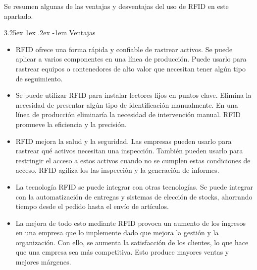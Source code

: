 \documentclass[12pt,a4paper,onecolumn,oneside]{report}
\makeatletter
\newcounter{subsubsubsection}[subsubsection]
\renewcommand\paragraph{\@startsection{paragraph}{5}{\z@}%
  {3.25ex \@plus1ex \@minus.2ex}%
  {-1em}%
  {\normalfont\normalsize\bfseries}}
\makeatother
\begin{document}
\label{Ventajas y desventajas}

Se resumen algunas de las ventajas y desventajas del uso de RFID en este apartado.

\paragraph{Ventajas}
\begin{itemize}
\item RFID ofrece una forma rápida y confiable de rastrear activos. Se puede aplicar a varios componentes en una línea de producción. Puede usarlo para rastrear equipos o contenedores de alto valor que necesitan tener algún tipo de seguimiento.
\item Se puede utilizar RFID para instalar lectores fijos en puntos clave. Elimina la necesidad de presentar algún tipo de identificación manualmente. En una línea de producción eliminaría la necesidad de intervención manual. RFID promueve la eficiencia y la precisión.
\item RFID mejora la salud y la seguridad. Las empresas pueden usarlo para rastrear qué activos necesitan una inspección. También pueden usarlo para restringir el acceso a estos activos cuando no se cumplen estas condiciones de acceso. RFID agiliza los las inspección y la generación de informes.
\item La tecnología RFID se puede integrar con otras tecnologías. Se puede integrar con la automatización de entregas y sistemas de elección de stocks, ahorrando tiempo desde el pedido hasta el envío de artículos.
\item La mejora de todo esto mediante RFID provoca un aumento de los ingresos en una empresa que lo implemente dado que mejora la gestión y la organización. Con ello, se aumenta la satisfacción de los clientes, lo que hace que una empresa sea más competitiva. Esto produce mayores ventas y mejores márgenes.
\end{itemize}
\end{document}
